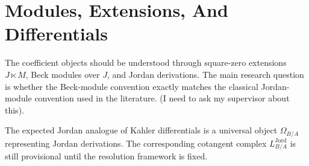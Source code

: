 \section{Modules, Extensions, And Differentials}

The coefficient objects should be understood through square-zero extensions
\(J \ltimes M\), Beck modules over \(J\), and Jordan derivations. The main
research question is whether the Beck-module convention exactly matches the
classical Jordan-module convention used in the literature. (I need to ask my supervisor about this).

The expected Jordan analogue of Kahler differentials is a universal object
\(\Omega_{B/A}\) representing Jordan derivations. The corresponding cotangent
complex \(L^{\mathrm{Jord}}_{B/A}\) is still provisional until the resolution
framework is fixed.
